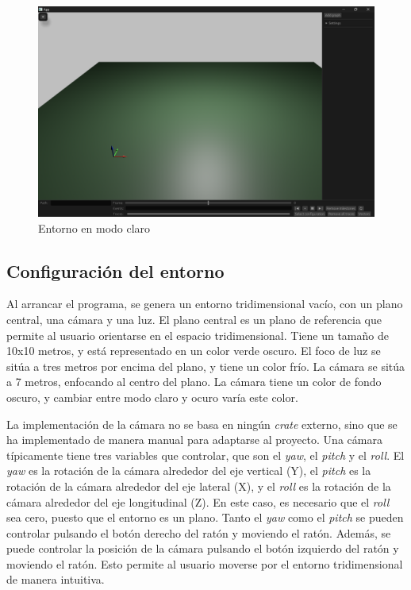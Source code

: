 \begin{figure}[H]
  \centering
  \includegraphics[width=\textwidth]{imagenes/modo_claro.png}
  \caption{Entorno en modo claro}
  \label{fig:modo_claro}
\end{figure}

\subsection{Configuración del entorno} \label{sec:bevy-configuracion}

Al arrancar el programa, se genera un entorno tridimensional vacío, con un plano central, una cámara y una luz. El plano central es un plano de referencia que permite al usuario orientarse en el espacio tridimensional. Tiene un tamaño de 10x10 metros, y está representado en un color verde oscuro. El foco de luz se sitúa a tres metros por encima del plano, y tiene un color frío. La cámara se sitúa a 7 metros, enfocando al centro del plano. La cámara tiene un color de fondo oscuro, y cambiar entre modo claro y ocuro varía este color.

La implementación de la cámara no se basa en ningún \textit{crate} externo, sino que se ha implementado de manera manual para adaptarse al proyecto. Una cámara típicamente tiene tres variables que controlar, que son el \textit{yaw}, el \textit{pitch} y el \textit{roll}. El \textit{yaw} es la rotación de la cámara alrededor del eje vertical (Y), el \textit{pitch} es la rotación de la cámara alrededor del eje lateral (X), y el \textit{roll} es la rotación de la cámara alrededor del eje longitudinal (Z). En este caso, es necesario que el \textit{roll} sea cero, puesto que el entorno es un plano. Tanto el \textit{yaw} como el \textit{pitch} se pueden controlar pulsando el botón derecho del ratón y moviendo el ratón. Además, se puede controlar la posición de la cámara pulsando el botón izquierdo del ratón y moviendo el ratón. Esto permite al usuario moverse por el entorno tridimensional de manera intuitiva.


